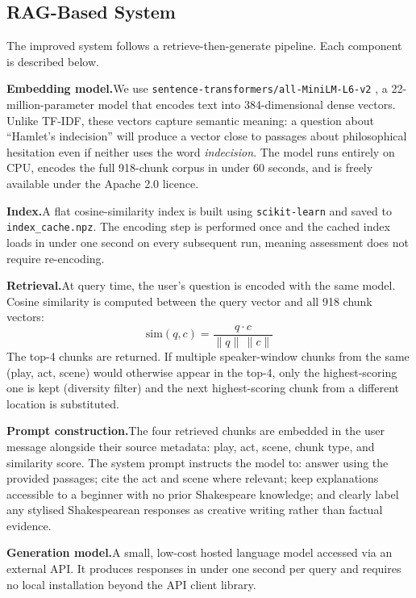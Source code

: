 \documentclass[10pt,conference]{IEEEtran}
\begin{document}
\subsection{RAG-Based System}

The improved system follows a retrieve-then-generate pipeline. Each
component is described below.

\medskip\noindent\textbf{Embedding model.}\enspace We use
\texttt{sentence-transformers/all-MiniLM-L6-v2}
\cite{reimers2019sentence}, a 22-million-parameter model that encodes
text into 384-dimensional dense vectors. Unlike TF-IDF, these vectors
capture semantic meaning: a question about ``Hamlet's indecision''
will produce a vector close to passages about philosophical hesitation
even if neither uses the word \textit{indecision}. The model runs
entirely on CPU, encodes the full 918-chunk corpus in under 60
seconds, and is freely available under the Apache 2.0 licence.

\medskip\noindent\textbf{Index.}\enspace A flat cosine-similarity
index is built using \texttt{scikit-learn} and saved to
\texttt{index\_cache.npz}. The encoding step is performed once and
the cached index loads in under one second on every subsequent run,
meaning assessment does not require re-encoding.

\medskip\noindent\textbf{Retrieval.}\enspace At query time, the user's
question is encoded with the same model. Cosine similarity is computed
between the query vector and all 918 chunk vectors:
\[
  \mathrm{sim}(q, c) = \frac{q \cdot c}{\|q\|\,\|c\|}
\]
The top-4 chunks are returned. If multiple speaker-window chunks from
the same (play, act, scene) would otherwise appear in the top-4, only
the highest-scoring one is kept (diversity filter) and the next
highest-scoring chunk from a different location is substituted.

\medskip\noindent\textbf{Prompt construction.}\enspace The four
retrieved chunks are embedded in the user message alongside their
source metadata: play, act, scene, chunk type, and similarity score.
The system prompt instructs the model to: answer using the provided
passages; cite the act and scene where relevant; keep explanations
accessible to a beginner with no prior Shakespeare knowledge; and
clearly label any stylised Shakespearean responses as creative writing
rather than factual evidence.

\medskip\noindent\textbf{Generation model.}\enspace A small, low-cost
hosted language model accessed via an external API. It produces
responses in under one second per query and requires no local
installation beyond the API client library.
\end{document}
